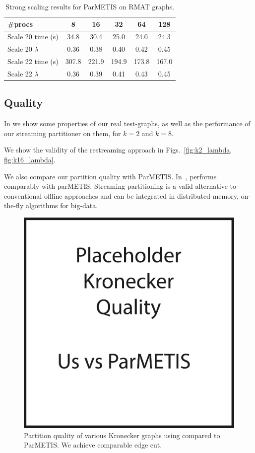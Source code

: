 \begin{table}
\caption{Strong scaling results for ParMETIS on RMAT graphs.}
\centering
\small
{ \begin{tabular}{ l | c | c | c | c | c }    \toprule
\label{table:rmat}
\#procs & 8 & 16 & 32 & 64 & 128 \\ \midrule
Scale 20 time (s) & 34.8 & 30.4 & 25.0 & 24.0 & 24.3 \\%
Scale 20 $\lambda$ & 0.36 & 0.38 & 0.40 & 0.42 & 0.45 \\%
Scale 22 time (s) & 307.8 & 221.9 & 194.9 & 173.8 & 167.0 \\
Scale 22 $\lambda$ & 0.36 & 0.39 & 0.41 & 0.43 & 0.45 \\
\hline
\end{tabular}\par
}
\label{tab:rmatpmstrong}
\end{table}

\subsection{Quality}
In  we show some properties of our real test-graphs, as well as the performance of our streaming partitioner on them, for $k=2$ and $k=8$. 

We show the validity of the restreaming approach in Figs.~\ref{fig:k2_lambda, fig:k16_lambda}.

We also compare our partition quality with ParMETIS.
In~, \ourmethod performs comparably with parMETIS. Streaming partitioning is a valid alternative to conventional offline approaches and can be integrated in distributed-memory, on-the-fly algorithms for big-data.

\begin{figure}[h!]
\centering
  \includegraphics[width=0.8\columnwidth]{figures/kronecker_quality_tests.pdf}
  \caption{Partition quality of various Kronecker graphs using \ourmethod compared to ParMETIS. We achieve comparable edge cut.}
  \label{fig:kronqual}
\end{figure}

